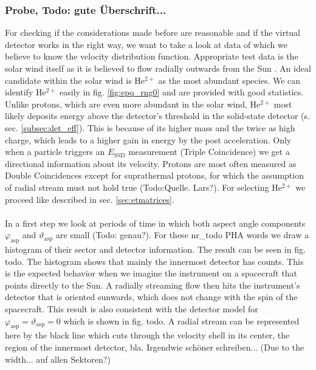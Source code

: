 \subsubsection{Probe, Todo: gute Überschrift...}
For checking if the considerations made before are reasonable and if the virtual detector works in the right way, we want to take a look at data of which we believe to know the velocity distribution function. Appropriate test data is the solar wind itself as it is believed to flow radially outwards from the Sun \citep[][,ch. 6.1]{prlss_2004}. An ideal candidate within the solar wind is $\mathrm{He^{2+}}$ as the most abundant species. We can identify $\mathrm{He^{2+}}$ easily in fig. \ref{fig:epq_rng0} and are provided with good statistics. Unlike protons, which are even more abundant in the solar wind, $\mathrm{He^{2+}}$ most likely deposits energy above the detector's threshold in the solid-state detector (s. sec. \ref{subsec:det_eff}). This is because of its higher mass and the twice as high charge, which leads to a higher gain in energy by the post acceleration. Only when a particle triggers an $E_{\mathrm{SSD}}$ measurement (Triple Coincidence) we get a directional information about its velocity. Protons are most often measured as Double Coincidences except for suprathermal protons, for which the assumption of radial stream must not hold true (Todo:Quelle. Lars?). For selecting $\mathrm{He^{2+}}$ we proceed like described in sec. \ref{sec:etmatrices}.
\\ \\
In a first step we look at periods of time in which both aspect angle components $\varphi_{\mathrm{asp}}$ and $\vartheta_{\mathrm{asp}}$ are small (Todo: genau?). For these nr\_todo PHA words we draw a histogram of their sector and detector information. The result can be seen in fig. todo. The histogram shows that mainly the innermost detector has counts. This is the expected behavior when we imagine the instrument on a spacecraft that points directly to the Sun. A radially streaming flow then hits the instrument's detector that is oriented sunwards, which does not change with the spin of the spacecraft. This result is also consistent with the detector model for $\varphi_{\mathrm{asp}} = \vartheta_{\mathrm{asp}} = 0$ which is shown in fig. todo. A radial stream can be represented here by the black line which cuts through the velocity shell in its center, the region of the innermost detector, bla. Irgendwie schöner schreiben...
(Due to the width... auf allen Sektoren?)
\\ \\
